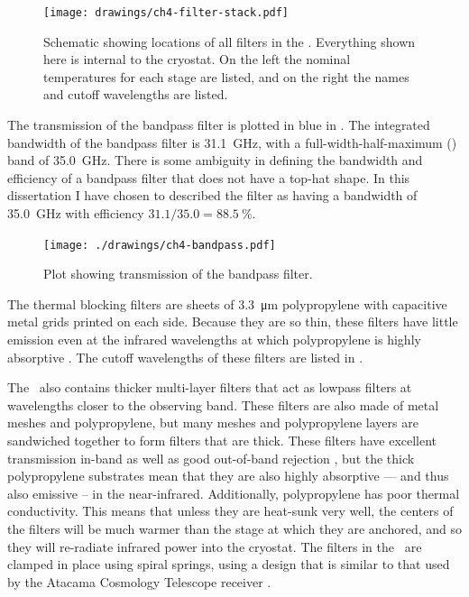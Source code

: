 \begin{figure}
\centering
\texttt{[image: drawings/ch4-filter-stack.pdf]}
\caption[Schematic showing locations of all filters in the \Imager]{
  Schematic showing locations of all filters in the \Imager.
  Everything shown here is internal to the cryostat.
  On the left the nominal temperatures for each stage are listed, and on the right the names and cutoff wavelengths are listed.
}
\label{fig:ch4-filter-stack}
\end{figure}

The transmission of the bandpass filter is plotted in blue in .
The integrated bandwidth of the bandpass filter is \SI{31.1}{\GHz}, with a full-width-half-maximum (\FWHM) band of \SI{35.0}{\GHz}.
There is some ambiguity in defining the bandwidth and efficiency of a bandpass filter that does not have a top-hat shape.
In this dissertation I have chosen to described the filter as having a bandwidth of \SI{35.0}{\GHz} with efficiency $31.1 / 35.0 = \SI{88.5}{\percent}$.

\begin{figure}
\centering
\texttt{[image: ./drawings/ch4-bandpass.pdf]}
\caption[Plot showing transmission of the bandpass filter.]{
  Plot showing transmission of the bandpass filter.
}
\label{fig:ch4-bandpass}
\end{figure}

The thermal blocking filters are sheets of \SI{3.3}{\um} polypropylene with capacitive metal grids printed on each side.
Because they are so thin, these filters have little emission even at the infrared wavelengths at which polypropylene is highly absorptive \cite{tucker_thermal_2006}.
The cutoff wavelengths of these filters are listed in .

The \Imager\ also contains thicker multi-layer filters that act as lowpass filters at wavelengths closer to the observing band.
These filters are also made of metal meshes and polypropylene, but many meshes and polypropylene layers are sandwiched together to form filters that are  thick.
These filters have excellent transmission in-band as well as good out-of-band rejection \cite{ade_review_2006}, but the thick polypropylene substrates mean that they are also highly absorptive --- and thus also emissive -- in the near-infrared.
Additionally, polypropylene has poor thermal conductivity.
This means that unless they are heat-sunk very well, the centers of the filters will be much warmer than the stage at which they are anchored, and so they will re-radiate infrared power into the cryostat.
The filters in the \Imager\ are clamped in place using spiral springs, using a design that is similar to that used by the Atacama Cosmology Telescope receiver \cite{swetz_overview_2011}.

